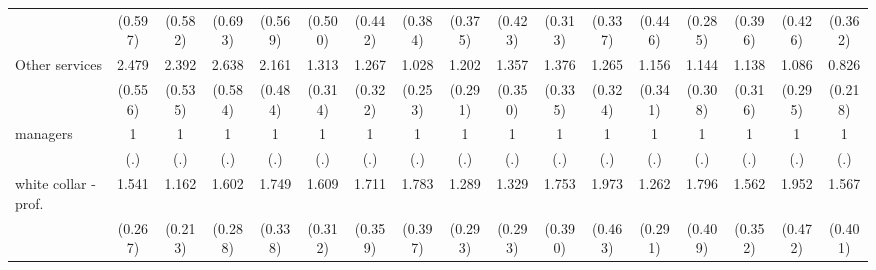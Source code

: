 {\begin{tabular}{l*{16}{c}}
                    &     (0.597)         &     (0.582)         &     (0.693)         &     (0.569)         &     (0.500)         &     (0.442)         &     (0.384)         &     (0.375)         &     (0.423)         &     (0.313)         &     (0.337)         &     (0.446)         &     (0.285)         &     (0.396)         &     (0.426)         &     (0.362)         \\
[1em]
Other services      &       2.479\sym{***}&       2.392\sym{***}&       2.638\sym{***}&       2.161\sym{***}&       1.313         &       1.267         &       1.028         &       1.202         &       1.357         &       1.376         &       1.265         &       1.156         &       1.144         &       1.138         &       1.086         &       0.826         \\
                    &     (0.556)         &     (0.535)         &     (0.584)         &     (0.484)         &     (0.314)         &     (0.322)         &     (0.253)         &     (0.291)         &     (0.350)         &     (0.335)         &     (0.324)         &     (0.341)         &     (0.308)         &     (0.316)         &     (0.295)         &     (0.218)         \\
[1em]
managers            &           1         &           1         &           1         &           1         &           1         &           1         &           1         &           1         &           1         &           1         &           1         &           1         &           1         &           1         &           1         &           1         \\
                    &         (.)         &         (.)         &         (.)         &         (.)         &         (.)         &         (.)         &         (.)         &         (.)         &         (.)         &         (.)         &         (.)         &         (.)         &         (.)         &         (.)         &         (.)         &         (.)         \\
[1em]
white collar - prof.&       1.541\sym{*}  &       1.162         &       1.602\sym{**} &       1.749\sym{**} &       1.609\sym{*}  &       1.711\sym{*}  &       1.783\sym{**} &       1.289         &       1.329         &       1.753\sym{*}  &       1.973\sym{**} &       1.262         &       1.796\sym{*}  &       1.562\sym{*}  &       1.952\sym{**} &       1.567         \\
                    &     (0.267)         &     (0.213)         &     (0.288)         &     (0.338)         &     (0.312)         &     (0.359)         &     (0.397)         &     (0.293)         &     (0.293)         &     (0.390)         &     (0.463)         &     (0.291)         &     (0.409)         &     (0.352)         &     (0.472)         &     (0.401)         \\

\end{tabular}}
